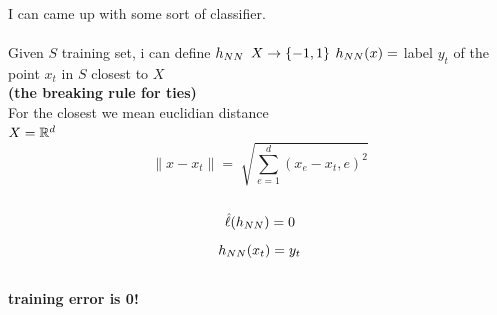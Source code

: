 \documentclass[../main.tex]{subfiles}
\begin{document}
\\
I can came up with some sort of classifier.
\\\\
Given $S$ training set, i can define $h_{NN}$  $X \rightarrow \{-1,1\}\\
$
$h_{NN}(x) = $ label $y_t$ of the point $x_t$ in $S$ closest to $X$\\
\textbf{(the breaking rule for ties)}
\\
For the closest we mean euclidian distance
\\
$ X = \mathbb{R}^d
\\
$
$$ 
\| x - x_t \| = \sqrt[] {\sum_{e=1}^{d} (x_e-x_t,e)^2}
$$\\
$$
\hat{\ell}(h_{NN}) = 0  
$$
$$
h_{NN} (x_t) = y_t
$$
\\
\textbf{training error is 0!}
\end{document}
